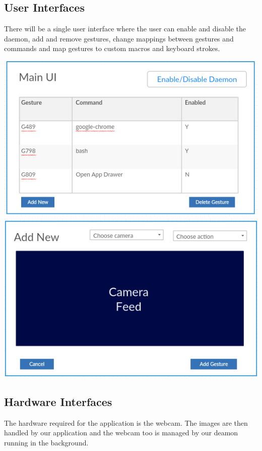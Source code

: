 \documentclass[11pt]{report}
\begin{document}
\subsection{User Interfaces}
There will be a single user interface where the user can enable and disable the daemon, add and remove gestures, change mappings between gestures and commands and map gestures to custom macros and keyboard strokes.
\\
\begin{center}
    \includegraphics[scale=0.8]{mainui.png}
    \\
    \includegraphics[scale=0.8]{addnewui.png}
\end{center}


\subsection{Hardware Interfaces}
The hardware required for the application is the webcam. The images are then handled by our application and the webcam too is managed by our deamon running in the background.
\end{document}
